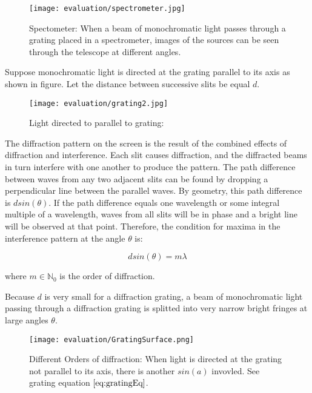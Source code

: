 \begin{figure}[H]
  \centering
  \texttt{[image: evaluation/spectrometer.jpg]}
  \label{fig:spectometer}
  \caption{Spectometer: When a beam of monochromatic light passes through a grating placed in a spectrometer, images of the sources can be seen through the telescope at different angles.}
\end{figure}

Suppose monochromatic light is directed at the grating parallel to its axis as shown in figure. Let the distance between successive slits be equal $d$.

\begin{figure}[H]
  \centering
  \texttt{[image: evaluation/grating2.jpg]}
  \label{fig:lighthitsgrating}
  \caption{Light directed to parallel to grating:}
\end{figure}

The diffraction pattern on the screen is the result of the combined effects of diffraction and interference. Each slit causes diffraction, and the diffracted beams in turn interfere with one another to produce the pattern. The path difference between waves from any two adjacent slits can be found by dropping a perpendicular line between the parallel waves. By geometry, this path difference is $d sin(\theta)$. If the path difference equals one wavelength or some integral multiple of a wavelength, waves from all slits will be in phase and a bright line will be observed at that point. Therefore, the condition for maxima in the interference pattern at the angle $\theta$ is: 

\begin{equation}
 d sin(\theta) = m \lambda 
\end{equation}

where $m \in \mathds{N}_0$ is the order of diffraction.

Because $d$ is very small for a diffraction grating, a beam of monochromatic light passing through a diffraction grating is splitted into very narrow bright fringes at large angles $\theta$.

\begin{figure}[H]
  \centering
  \texttt{[image: evaluation/GratingSurface.png]}
  \caption{Different Orders of diffraction: When light is directed at the grating not parallel to its axis, there is another $sin(a)$ invovled. See grating equation $\ref{eq:gratingEq}$.}
\label{fig:gratingdiffractionorders}
\end{figure}

